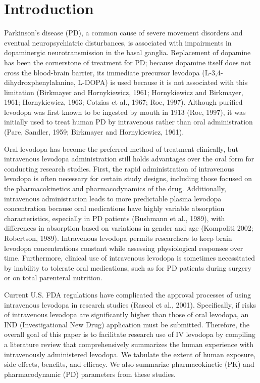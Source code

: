 \section{Introduction}
Parkinson’s disease (PD), a common cause of severe movement disorders and eventual neuropsychiatric disturbances, is associated with impairments in dopaminergic neurotransmission in the basal ganglia. Replacement of dopamine has been the cornerstone of treatment for PD; because dopamine itself does not cross the blood-brain barrier, its immediate precursor levodopa (L-3,4-dihydroxphenylalanine, L-DOPA) is used because it is not associated with this limitation (Birkmayer and Hornykiewicz, 1961; Hornykiewicz and Birkmayer, 1961; Hornykiewicz, 1963; Cotzias et al., 1967; Roe, 1997). Although purified levodopa was first known to be ingested by mouth in 1913 (Roe, 1997), it was initially used to treat human PD by intravenous rather than oral administration (Pare, Sandler, 1959; Birkmayer and Hornykiewicz, 1961).
	
Oral levodopa has become the preferred method of treatment clinically, but intravenous levodopa administration still holds advantages over the oral form for conducting research studies.  First, the rapid administration of intravenous levodopa is often necessary for certain study designs, including those focused on the pharmacokinetics and pharmacodynamics of the drug.  Additionally, intravenous administration leads to more predictable plasma levodopa concentration because oral medications have highly variable absorption characteristics, especially in PD patients (Bushmann et al., 1989), with differences in absorption based on variations in gender and age (Kompoliti 2002; Robertson, 1989).  Intravenous levodopa permits researchers to keep brain levodopa concentrations constant while assessing physiological responses over time.  Furthermore, clinical use of intravenous levodopa is sometimes necessitated by inability to tolerate oral medications, such as for PD patients during surgery or on total parenteral nutrition.  

Current U.S. FDA regulations have complicated the approval processes of using intravenous levodopa in research studies (Rascol et al., 2001).  Specifically, if risks of intravenous levodopa are significantly higher than those of oral levodopa, an IND (Investigational New Drug) application must be submitted.  Therefore, the overall goal of this paper is to facilitate research use of IV levodopa by compiling a literature review that comprehensively summarizes the human experience with intravenously administered levodopa.  We tabulate the extent of human exposure, side effects, benefits, and efficacy.  We also summarize pharmacokinetic (PK) and pharmacodynamic (PD) parameters from these studies. 
